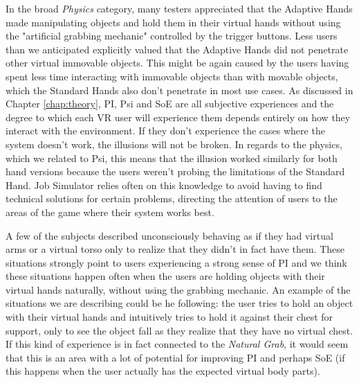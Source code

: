 In the broad \textit{Physics} category, many testers appreciated that the Adaptive Hands made manipulating objects and hold them in their virtual hands without using the "artificial grabbing mechanic" controlled by the trigger buttons. Less users than we anticipated explicitly valued that the Adaptive Hands did not penetrate other virtual immovable objects. This might be again caused by the users having spent less time interacting with immovable objects than with movable objects, which the Standard Hands also don't penetrate in most use cases. As discussed in Chapter \ref{chap:theory}, PI, Psi and SoE are all subjective experiences and the degree to which each VR user will experience them depends entirely on how they interact with the environment. If they don't experience the cases where the system doesn't work, the illusions will not be broken. In regards to the physics, which we related to Psi, this means that the illusion worked similarly for both hand versions because the users weren't probing the limitations of the Standard Hand. Job Simulator relies often on this knowledge to avoid having to find technical solutions for certain problems, directing the attention of users to the areas of the game where their system works best.

A few of the subjects described unconsciously behaving as if they had virtual arms or a virtual torso only to realize that they didn't in fact have them. These situations strongly point to users experiencing a strong sense of PI and we think these situations happen often when the users are holding objects with their virtual hands naturally, without using the grabbing mechanic. An example of the situations we are describing could be he following: the user tries to hold an object with their virtual hands and intuitively tries to hold it against their chest for support, only to see the object fall as they realize that they have no virtual chest. If this kind of experience is in fact connected to the \textit{Natural Grab}, it would seem that this is an area with a lot of potential for improving PI and perhaps SoE (if this happens when the user actually has the expected virtual body parts).

